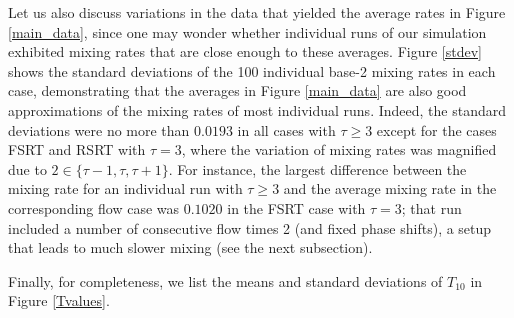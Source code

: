 \documentclass[12pt]{article}
\numberwithin{figure}{section}
\numberwithin{equation}{section}
\begin{document}
Let us also discuss variations in the data that yielded the average rates in Figure \ref{main_data}, since one may  wonder whether individual runs of our simulation exhibited mixing rates that are close enough to these averages.  
Figure \ref{stdev} shows the standard deviations of the 100 individual base-2 mixing rates in each case, demonstrating that the averages in Figure \ref{main_data} are also good approximations of the mixing rates of most individual runs.
Indeed, the standard deviations were no more than $0.0193$ in all cases with $\tau\ge 3$ except for the cases FSRT and RSRT with $\tau=3$, where the variation of mixing rates was  magnified due to  $2\in \{\tau-1,\tau,\tau+1\}$.  For instance, the largest difference between the mixing rate for an individual run with $\tau\ge 3$ and the  average mixing rate in the corresponding flow case  was $0.1020$ in the FSRT case with $\tau=3$; that run included a number of consecutive flow times 2 (and fixed phase shifts), a setup that leads to much slower mixing (see the next subsection).  


Finally, for completeness, we list the means and standard deviations of $T_{10}$ in Figure \ref{Tvalues}.
\end{document}
